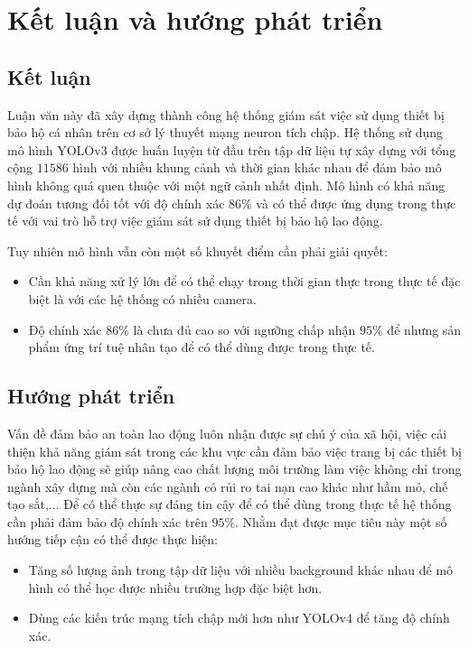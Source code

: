 \chapter{Kết luận và hướng phát triển}
\section{Kết luận}
Luận văn này đã xây dựng thành công hệ thống giám sát việc sử dụng thiết bị bảo hộ cá nhân trên cơ sở lý thuyết mạng neuron tích chập. Hệ thống sử dụng mô hình YOLOv3 được huấn luyện từ đầu trên tập dữ liệu tự xây dựng với tổng cộng $11586$ hình với nhiều khung cảnh và thời gian khác nhau để đảm bảo mô hình không quá quen thuộc với một ngữ cảnh nhất định. Mô hình có khả năng dự đoán tương đối tốt với độ chính xác $86\%$ và có thể được ứng dụng trong thực tế với vai trò hỗ trợ việc giám sát sử dụng thiết bị bảo hộ lao động.

Tuy nhiên mô hình vẫn còn một số khuyết điểm cần phải giải quyết:
\begin{itemize}
	\item Cần khả năng xử lý lớn để có thể chạy trong thời gian thực trong thực tế đặc biệt là với các hệ thống có nhiều camera.
	\item Độ chính xác $86\%$ là chưa đủ cao so với ngưỡng chấp nhận $95\%$ để nhưng sản phẩm ứng trí tuệ nhân tạo để có thể dùng được trong thực tế.
\end{itemize}

\section{Hướng phát triển}
Vấn đề đảm bảo an toàn lao động luôn nhận được sự chú ý của xã hội, việc cải thiện khả năng giám sát trong các khu vực cần đảm bảo việc trang bị các thiết bị bảo hộ lao động sẽ giúp nâng cao chất lượng môi trường làm việc không chỉ trong ngành xây dựng mà còn các ngành có rủi ro tai nạn cao khác như hầm mỏ, chế tạo sắt,... Để có thể thực sự đáng tin cậy để có thể dùng trong thực tế hệ thống cần phải đảm bảo độ chính xác trên $95\%$. Nhằm đạt được mục tiêu này một số hướng tiếp cận có thể được thực hiện:
\begin{itemize}
	\item Tăng số lượng ảnh trong tập dữ liệu với nhiều background khác nhau để mô hình có thể học được nhiều trường hợp đặc biệt hơn.
	\item Dùng các kiến trúc mạng tích chập mới hơn như YOLOv4 để tăng độ chính xác.
\end{itemize}
